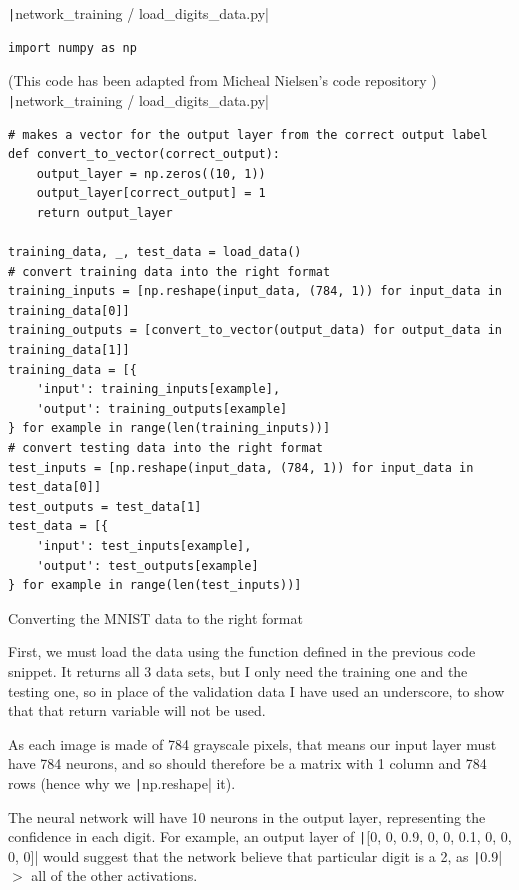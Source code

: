 \documentclass[12pt]{report}
\newcommand{\pil}[1]{\protect\texttt|#1|}
\begin{document}
\begin{listing}[H]
\pil{network_training / load_digits_data.py}
\begin{verbatim}
import numpy as np
\end{verbatim}
(This code has been adapted from Micheal Nielsen's code repository \cite{mnielsenGithub}) \\
\pil{network_training / load_digits_data.py}
\begin{verbatim}
# makes a vector for the output layer from the correct output label
def convert_to_vector(correct_output):
    output_layer = np.zeros((10, 1))
    output_layer[correct_output] = 1
    return output_layer

training_data, _, test_data = load_data()
# convert training data into the right format
training_inputs = [np.reshape(input_data, (784, 1)) for input_data in training_data[0]]
training_outputs = [convert_to_vector(output_data) for output_data in training_data[1]]
training_data = [{
    'input': training_inputs[example],
    'output': training_outputs[example]
} for example in range(len(training_inputs))]
# convert testing data into the right format
test_inputs = [np.reshape(input_data, (784, 1)) for input_data in test_data[0]]
test_outputs = test_data[1]
test_data = [{
    'input': test_inputs[example],
    'output': test_outputs[example]
} for example in range(len(test_inputs))]
\end{verbatim}
\caption{Converting the MNIST data to the right format}\label{cs:MNISTtoRightFormat}
\end{listing}

First, we must load the data using the function defined in the previous code snippet. It returns all 3 data sets, but I only need the training one and the testing one, so in place of the validation data I have used an underscore, to show that that return variable will not be used.

As each image is made of 784 grayscale pixels, that means our input layer must have 784 neurons, and so should therefore be a matrix with 1 column and 784 rows (hence why we \pil{np.reshape} it).

The neural network will have 10 neurons in the output layer, representing the confidence in each digit. For example, an output layer of \pil{[0, 0, 0.9, 0, 0, 0.1, 0, 0, 0, 0]} would suggest that the network believe that particular digit is a 2, as \pil{0.9} $>$ all of the other activations.
\end{document}
